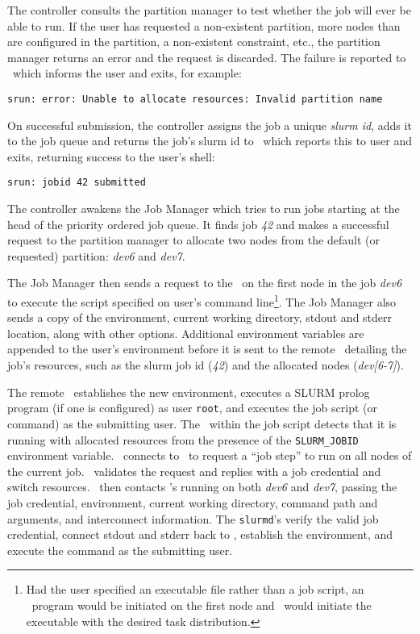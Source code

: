 The controller consults the partition manager to test whether the job 
will ever be able to run.  If the user has requested a non-existent partition,
more nodes than are configured in the partition, a non-existent constraint, 
etc., the partition manager returns an error and the request is discarded.
The failure is reported to \srun\ which informs the user and exits, for example:
\begin{verbatim}
srun: error: Unable to allocate resources: Invalid partition name
\end{verbatim}

On successful submission, the controller assigns the job a unique 
{\em slurm id}, adds it to the job queue and returns the job's
slurm id to \srun\, which reports this to user and exits, returning
success to the user's shell:

\begin{verbatim}
srun: jobid 42 submitted
\end{verbatim}

The controller awakens the Job Manager which tries to run
jobs starting at the head of the priority ordered job queue.  It finds job {\em 42}
and makes a successful request to the partition manager to allocate 
two nodes from the default (or requested) partition: {\em dev6} and 
{\em dev7}.

The Job Manager then sends a request to the \slurmd\ on the first node 
in the job {\em dev6} to execute the script specified on user's
command line\footnote{Had the user specified an executable file rather 
than a job script, an \srun\ program would be initiated on the first 
node and \srun\ would initiate the executable with the desired task distribution.}.
The Job Manager also sends a 
copy of the environment, current working directory, stdout and stderr location,
along with other options. Additional environment variables are appended
to the user's environment before it is sent to the remote \slurmd\ detailing
the job's resources, such as the slurm job id ({\em 42}) and the
allocated nodes ({\em dev[6-7]}).

The remote \slurmd\ establishes the new environment, executes a SLURM 
prolog program (if one is configured) as user {\tt root}, and executes the
job script (or command) as the submitting user. The \srun\ within the job script 
detects that it is running with allocated resources from the presence
of the {\tt SLURM\_JOBID} environment variable. \srun\ connects to
\slurmctld\ to request a ``job step'' to run on all nodes of the current
job. \slurmctld\ validates the request and replies with a job credential
and switch resources. \srun\ then contacts \slurmd 's running on both
{\em dev6} and {\em dev7}, passing the job credential, environment,
current working directory, command path and arguments, and interconnect
information. The {\tt slurmd}'s verify the valid job credential, connect
stdout and stderr back to \srun , establish the environment, and execute
the command as the submitting user.

